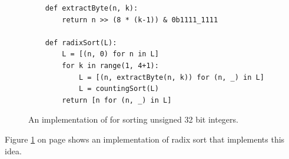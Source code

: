 \begin{figure}[!ht]
\centering
\begin{verbatim}
    def extractByte(n, k):
        return n >> (8 * (k-1)) & 0b1111_1111
    
    def radixSort(L):
        L = [(n, 0) for n in L]
        for k in range(1, 4+1):
            L = [(n, extractByte(n, k)) for (n, _) in L]
            L = countingSort(L)
        return [n for (n, _) in L]    
\end{verbatim}
\vspace*{-0.3cm}
\caption{An implementation of  for sorting unsigned 32 bit integers.}
\label{fig:radix-sort.stlx}
\end{figure}
Figure \ref{fig:radix-sort.stlx} on page \pageref{fig:radix-sort.stlx} shows an implementation of radix
sort that implements this idea.
